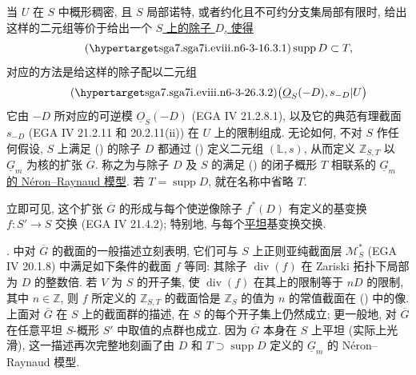当 $U$ 在 $S$ 中概形稠密, 且 $S$ 局部诺特, 或者约化且不可约分支集局部有限时, 给出这样的二元组等价于给出一个 \underline{$S$ 上的除子 $D$, 使得}
\begin{equation}\tag{\SGARefTarget{sga7.sga7i.eviii.n6-3-1}{6.3.1}}
 \operatorname{supp}D\subset T,
\end{equation}
对应的方法是给这样的除子配以二元组
\begin{equation}\tag{\SGARefTarget{sga7.sga7i.eviii.n6-3-2}{6.3.2}}
 \bigl(\underline O_S(-D),s_{-D}|U\bigr)
\end{equation}
它由 $-D$ 所对应的可逆模 $\underline O_S(-D)$ (EGA IV 21.2.8.1), 以及它的典范有理截面 $s_{-D}$ (EGA IV 21.2.11 和 20.2.11(ii)) 在 $U$ 上的限制组成. 无论如何, 不对 $S$ 作任何假设, $S$ 上满足 () 的除子 $D$ 都通过 () 定义二元组 $(\mathbb L,s)$, 从而定义 $\mathbb Z_{S,T}$ 以 $\underline G_m$ 为核的扩张 $\overline G$. 称之为与除子 $D$ 及 $S$ 的满足 () 的闭子概形 $T$ 相联系的 \underline{$\underline G_m$ 的 N\'eron--Raynaud 模型}. 若 $T=\operatorname{supp}D$, 就在名称中省略 $T$.

立即可见, 这个扩张 $\overline G$ 的形成与每个使逆像除子 $f^*(D)$ 有定义的基变换 $f:S'\to S$ 交换 (EGA IV 21.4.2); 特别地, 与每个\underline{平坦}基变换交换.

\medskip
\noindent {}.  中对 $\overline G$ 的截面的一般描述立刻表明, 它们可与 $S$ 上正则亚纯截面层 $\mathcal M_S^*$ (EGA IV 20.1.8) 中满足如下条件的截面 $f$ 等同: 其除子 $\operatorname{div}(f)$ 在 Zariski 拓扑下局部为 $D$ 的整数倍. 若 $V$ 为 $S$ 的开子集, 使 $\operatorname{div}(f)$ 在其上的限制等于 $nD$ 的限制, 其中 $n\in\mathbb Z$, 则 $f$ 所定义的 $\mathbb Z_{S,T}$ 的截面恰是 $\mathbb Z_S$ 的值为 $n$ 的常值截面在 () 中的像. 上面对 $\overline G$ 在 $S$ 上的截面群的描述, 在 $S$ 的每个开子集上仍然成立; 更一般地, 对 $\overline G$ 在任意平坦 $S$-概形 $S'$ 中取值的点群也成立. 因为 $\overline G$ 本身在 $S$ 上平坦 (实际上光滑), 这一描述再次完整地刻画了由 $D$ 和 $T\supset\operatorname{supp}D$ 定义的 $\underline G_m$ 的 N\'eron--Raynaud 模型.

